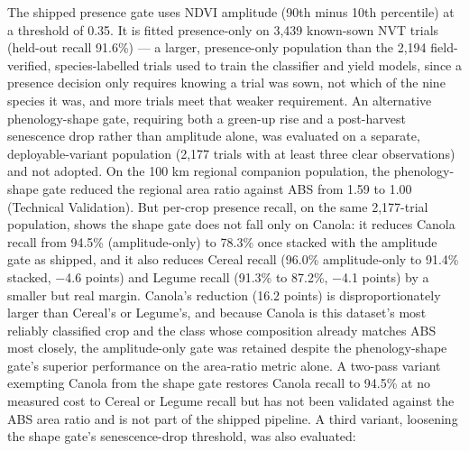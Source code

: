 The shipped presence gate uses NDVI amplitude (90th minus 10th percentile) at a threshold of 0.35. It is fitted presence-only on 3,439 known-sown NVT trials (held-out recall 91.6\%) --- a larger, presence-only population than the 2,194 field-verified, species-labelled trials used to train the classifier and yield models, since a presence decision only requires knowing a trial was sown, not which of the nine species it was, and more trials meet that weaker requirement. An alternative phenology-shape gate, requiring both a green-up rise and a post-harvest senescence drop rather than amplitude alone, was evaluated on a separate, deployable-variant population (2,177 trials with at least three clear observations) and not adopted. On the 100 km regional companion population, the phenology-shape gate reduced the regional area ratio against ABS from 1.59 to 1.00 (Technical Validation). But per-crop presence recall, on the same 2,177-trial population, shows the shape gate does not fall only on Canola: it reduces Canola recall from 94.5\% (amplitude-only) to 78.3\% once stacked with the amplitude gate as shipped, and it also reduces Cereal recall (96.0\% amplitude-only to 91.4\% stacked, $-$4.6 points) and Legume recall (91.3\% to 87.2\%, $-$4.1 points) by a smaller but real margin. Canola's reduction (16.2 points) is disproportionately larger than Cereal's or Legume's, and because Canola is this dataset's most reliably classified crop and the class whose composition already matches ABS most closely, the amplitude-only gate was retained despite the phenology-shape gate's superior performance on the area-ratio metric alone. A two-pass variant exempting Canola from the shape gate restores Canola recall to 94.5\% at no measured cost to Cereal or Legume recall but has not been validated against the ABS area ratio and is not part of the shipped pipeline. A third variant, loosening the shape gate's senescence-drop threshold, was also evaluated:

